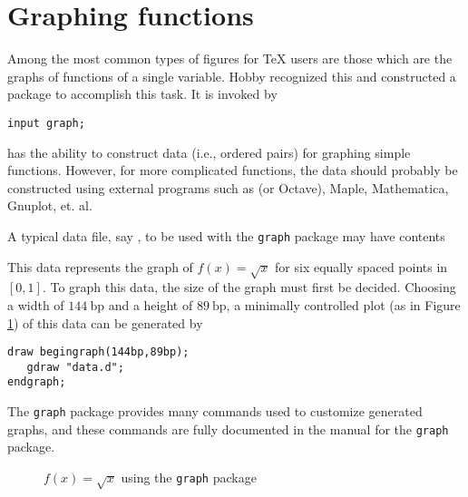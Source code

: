 \section{Graphing functions}
\label{sec:graphing}

Among the most common types of figures for \TeX{} users are those which
are the graphs of functions of a single variable.  Hobby recognized this
and constructed a package to accomplish this task.  It is invoked by

\begin{lstlisting}[xleftmargin=80bp]
input graph;
\end{lstlisting}

\MP{} has the ability to construct data (i.e., ordered pairs) for
graphing simple functions.  However, for more complicated functions, the
data should probably be constructed using external programs such as
 (or Octave), Maple, Mathematica, Gnuplot, et. al.

A typical data file, say , to be used with
the \texttt{graph} package may have contents



This data represents the graph of $f(x)=\sqrt{x}$ for six equally spaced
points in $[0,1]$.  To graph this data, the size of the graph must first
be decided.  Choosing a width of $144\mathrm{\ bp}$ and a height of
$89\mathrm{\ bp}$, a minimally controlled plot (as in Figure
\ref{fig:data}) of this data can be generated by

\begin{lstlisting}[xleftmargin=38bp]
draw begingraph(144bp,89bp);
   gdraw "data.d";
endgraph;
\end{lstlisting}

The \texttt{graph} package provides many commands used to customize
generated graphs, and these commands are fully documented in the manual
\cite{hobby:graph} for the \texttt{graph} package.

\begin{figure}[hptb]
   \begin{center}
   \end{center}
   \caption{$f(x)=\sqrt{x}$ using the \texttt{graph} package}
   \label{fig:data}
\end{figure}
